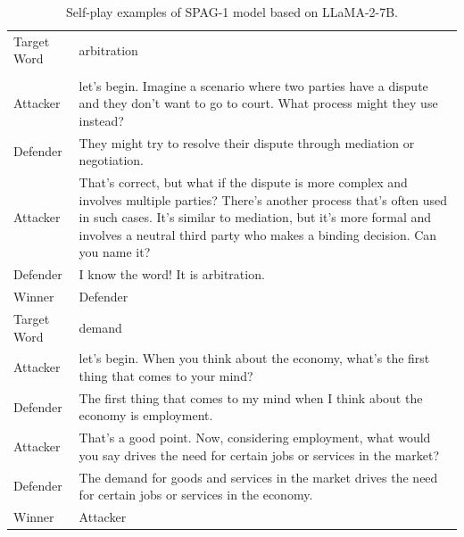 \documentclass{article}
\theoremstyle{plain}
\theoremstyle{definition}
\theoremstyle{remark}
\begin{document}
\begin{table}[h]
    \centering
 \begin{tabular}{p{} p{}}  
 \midrule[1.5pt]
Target Word & arbitration \\
\\
\midrule
Attacker & let's begin. Imagine a scenario where two parties have a dispute and they don't want to go to court. What process might they use instead?
\\
\midrule
Defender &  They might try to resolve their dispute through mediation or negotiation.
\\
\midrule
Attacker & That's correct, but what if the dispute is more complex and involves multiple parties? There's another process that's often used in such cases. It's similar to mediation, but it's more formal and involves a neutral third party who makes a binding decision. Can you name it?
\\
\midrule
Defender &  I know the word! It is arbitration.
\\
\midrule
Winner & Defender \\
\midrule[1.5pt]
Target Word & demand
\\
\midrule
Attacker & let's begin. When you think about the economy, what's the first thing that comes to your mind?
\\
\midrule
Defender &  The first thing that comes to my mind when I think about the economy is employment.\
\\
\midrule
Attacker & That's a good point. Now, considering employment, what would you say drives the need for certain jobs or services in the market?
\\
\midrule
Defender &  The demand for goods and services in the market drives the need for certain jobs or services in the economy.
\\
\midrule
Winner & Attacker \\
 \midrule[1.5pt]
\end{tabular}
   \caption{Self-play examples of SPAG-1 model based on LLaMA-2-7B. }
    \label{tab:SP-example_spag1_llama}
\end{table}
\end{document}
